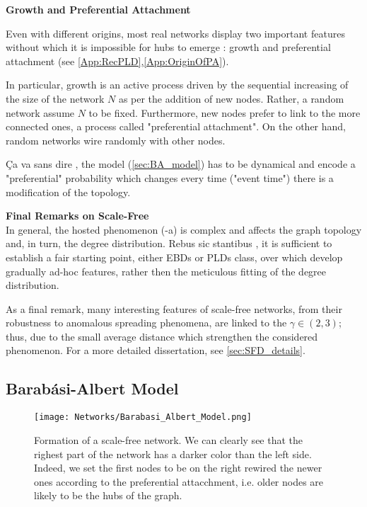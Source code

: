\documentclass[a4paper,10pt, oneside]{book} %
\theoremstyle{definition}
\begin{document}
{\large \textbf{Growth and Preferential Attachment}} 

Even with different origins, most real networks display two important features without which it is impossible for hubs to emerge \cite{barabasi::2016networkbook}: growth and preferential attachment (see \autoref{App:RecPLD},\autoref{App:OriginOfPA}). 

In particular, growth is an active process driven by the sequential increasing of the size of the network $N$ as per the addition of new nodes. Rather, a random network assume $N$ to be fixed. \newline
Furthermore, new nodes prefer to link to the more connected ones, a process called "preferential attachment". On the other hand, random networks wire randomly with other nodes.

Ça va sans dire \label{cit:AMarzo}, the model (\autoref{sec:BA_model}) has to be dynamical and encode a "preferential" probability which changes every time ("event time") there is a modification of the topology. 

{\large \textbf{Final Remarks on Scale-Free}} \\
In general, the hosted phenomenon (-a) is complex and affects the graph topology and, in turn, the degree distribution. Rebus sic stantibus \label{cit:DarioMassa}, it is sufficient to establish a fair starting point, either EBDs or PLDs class, over which develop gradually ad-hoc features, rather then the meticulous fitting of the degree distribution.

As a final remark, many interesting features of scale-free networks, from their robustness to anomalous spreading phenomena, are linked to the $\gamma \in (2,3)$; thus, due to the small average distance which strengthen the considered phenomenon.
For a more detailed dissertation, see \autoref{sec:SFD_details}.

\newpage
\subsection{Barabási-Albert Model}
\begin{figure}[ht]
	\texttt{[image: Networks/Barabasi\_Albert\_Model.png]}
	\centering
	\caption{Formation of a scale-free network. We can clearly see that the righest part of the network has a darker color than the left side. Indeed, we set the first nodes to be on the right rewired the newer ones according to the preferential attacchment, i.e. older nodes are likely to be the hubs of the graph.}
	\label{fig:LCD_growth}
\end{figure}
\end{document}
